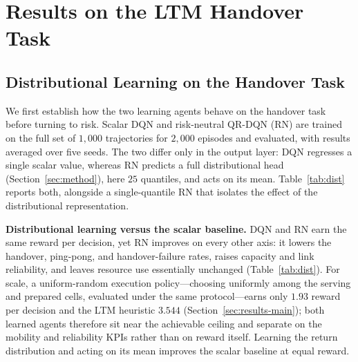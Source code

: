 \documentclass[conference]{IEEEtran}
\begin{document}
\section{Results on the LTM Handover Task}
\label{sec:results}

\subsection{Distributional Learning on the Handover Task}
\label{sec:results-dist}
We first establish how the two learning agents behave on the handover task before
turning to risk. Scalar DQN and risk-neutral QR-DQN (RN) are trained on the full
set of $1{,}000$ trajectories for $2{,}000$ episodes and evaluated, with results
averaged over five seeds. The two differ only in the output layer: DQN regresses a single
scalar value, whereas RN predicts a full distributional head
(Section~\ref{sec:method}), here $25$ quantiles, and acts on its mean.
Table~\ref{tab:dist} reports both, alongside a single-quantile RN that isolates the
effect of the distributional representation.

\textbf{Distributional learning versus the scalar baseline.}
DQN and RN earn the same reward per decision, yet RN improves on
every other axis: it lowers the handover, ping-pong, and handover-failure rates,
raises capacity and link reliability, and leaves resource use essentially
unchanged (Table~\ref{tab:dist}). For scale, a uniform-random execution
policy---choosing uniformly among the serving and prepared cells, evaluated under
the same protocol---earns only $1.93$ reward per decision and the LTM heuristic
$3.544$ (Section~\ref{sec:results-main}); both learned agents therefore sit near
the achievable ceiling and separate on the mobility and reliability KPIs rather
than on reward itself. Learning the return distribution and acting on
its mean improves the scalar baseline at equal reward.
\end{document}

